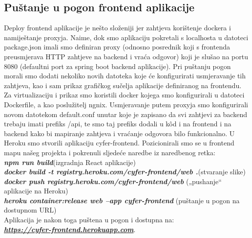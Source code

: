 		\subsection{Puštanje u pogon frontend aplikacije}
		
		Deploy frontend aplikacije je nešto složeniji jer zahtjeva korištenje dockera i namiještanje proxyja. Naime, dok smo aplikaciju pokretali s localhosta u datoteci package.json imali smo definiran proxy (odnosno posrednik koji s frontenda preusmjerava HTTP zahtjeve na backend i vraća odgovor) koji je slušao na portu 8080 (defaultni port za spring boot backend aplikacije). Pri puštanju pogon morali smo dodati nekoliko novih datoteka koje će konfigurirati usmjeravanje tih zahtjeva, kao i sam prikaz grafičkog sučelja aplikacije definiranog na frontendu.
		Za virtualizaciju i prikaz smo koristili docker kojega smo konfigurirali u datoteci Dockerfile, a kao poslužitelj ngnix. Usmjeravanje putem proxyja smo konfigurirali novom datotekom default.conf unutar koje je zapisano da svi zahtjevi za backend trebaju imati prefiks /api, te smo taj prefiks dodali u kôd i na frontend i na backend kako bi mapiranje zahtjeva i vraćanje odgovora bilo funkcionalno.
		U Heroku smo stvorili aplikaciju cyfer-frontend. Pozicionirali smo se u frontend mapu našeg projekta i pokrenuli sljedeće naredbe iz naredbenog retka:\\
		
		\noindent
		\textbf{\textit{npm run build}}(izgradnja React aplikacije)\\
		\textbf{\textit{docker build -t registry.heroku.com/cyfer-frontend/web .}}(stvaranje slike)\\
		\textbf{\textit{docker push registry.heroku.com/cyfer-frontend/web}} („pushanje“ aplikacije na Heroku)\\
		\textbf{\textit{heroku container:release web --app cyfer-frontend }} (puštanje u pogon na dostupnom URL)\\
			
		\noindent	
		Aplikacija je nakon toga puštena u pogon i dostupna na:\\
		\textbf{\textit{\href{ https://cyfer-frontend.herokuapp.com}{https://cyfer-frontend.herokuapp.com}}}.
		
